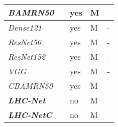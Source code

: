 \documentclass[fleqn,10pt]{SelfArx}
\begin{document}
\begin{center}
\begin{tabular}{||p{2.2cm} | p{1.3cm} | p{0.7cm} | p{1.2cm} | p{0.8cm}||}
\hline
\hline
\textit{BAMRN50}\cite{resmaskingnet}       & \hspace{0.15cm}               & \hspace{0.12cm}yes   & \hspace{0.05cm}M & \\
\hline
\hline
\textit{Dense121}\cite{resmaskingnet}       & \hspace{0.15cm}               & \hspace{0.12cm}yes   & \hspace{0.12cm}M & \hspace{0.4cm}-\\
\hline
\hline
\textit{ResNet50}\cite{khanzada2020facial}       & \hspace{0.15cm}               & \hspace{0.12cm}yes   & \hspace{0.12cm}M & \hspace{0.4cm}-\\
\hline
\hline
\textit{ResNet152}\cite{resmaskingnet}       & \hspace{0.15cm}               & \hspace{0.12cm}yes   & \hspace{0.05cm}M & \hspace{0.4cm}-\\
\hline
\hline
\textit{VGG}\cite{khaireddin2021facial}       & \hspace{0.15cm}               & \hspace{0.12cm}yes   & \hspace{0.05cm}M & \hspace{0.4cm}-\\
\hline
\hline
\textit{CBAMRN50}\cite{resmaskingnet}       & \hspace{0.15cm}               & \hspace{0.12cm}yes   & \hspace{0.05cm}M & \hspace{0.2cm}\\
\hline
\hline
\textbf{\textit{LHC-Net}}                      & \hspace{0.15cm} & \hspace{0.15cm}no  & \hspace{0.12cm}M & \\
\hline
\hline
\textbf{\textit{LHC-NetC}}                    & \hspace{0.15cm} & \hspace{0.15cm}no  & \hspace{0.12cm}M & \\

\end{tabular}
\end{center}
\end{document}
